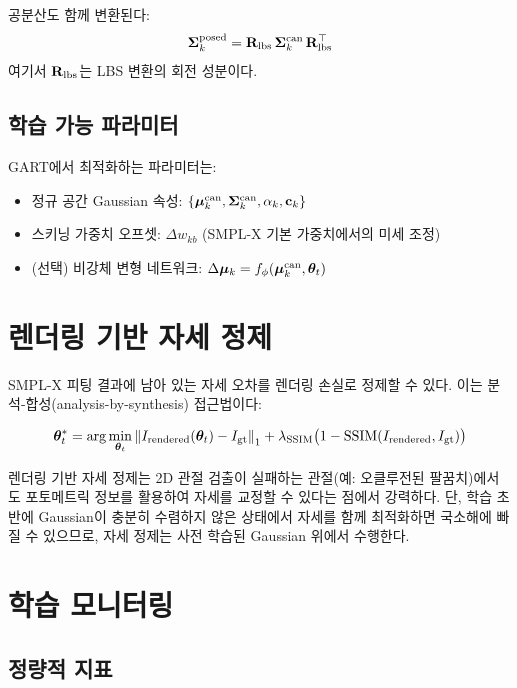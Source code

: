 \documentclass[11pt, a4paper]{report}
\begin{document}
공분산도 함께 변환된다:
\begin{equation}
  \bm{\Sigma}_k^{\text{posed}} = \mathbf{R}_{\text{lbs}} \, \bm{\Sigma}_k^{\text{can}} \, \mathbf{R}_{\text{lbs}}^\top
\end{equation}
여기서 $\mathbf{R}_{\text{lbs}}$는 LBS 변환의 회전 성분이다.

\subsection{학습 가능 파라미터}

GART에서 최적화하는 파라미터는:
\begin{itemize}[nosep]
  \item 정규 공간 Gaussian 속성: $\{\bm{\mu}_k^{\text{can}}, \bm{\Sigma}_k^{\text{can}}, \alpha_k, \mathbf{c}_k\}$
  \item 스키닝 가중치 오프셋: $\Delta w_{kb}$ (SMPL-X 기본 가중치에서의 미세 조정)
  \item (선택) 비강체 변형 네트워크: $\Delta\bm{\mu}_k = f_\phi(\bm{\mu}_k^{\text{can}}, \bm{\theta}_t)$
\end{itemize}

\section{렌더링 기반 자세 정제}

SMPL-X 피팅 결과에 남아 있는 자세 오차를 렌더링 손실로 정제할 수 있다.
이는 분석-합성(analysis-by-synthesis) 접근법이다:

\begin{equation}
  \bm{\theta}_t^* = \arg\min_{\bm{\theta}_t} \left\| I_{\text{rendered}}(\bm{\theta}_t) - I_{\text{gt}} \right\|_1 + \lambda_{\text{SSIM}} \big(1 - \text{SSIM}(I_{\text{rendered}}, I_{\text{gt}})\big)
\end{equation}

\begin{keyidea}
렌더링 기반 자세 정제는 2D 관절 검출이 실패하는 관절(예: 오클루전된 팔꿈치)에서도
포토메트릭 정보를 활용하여 자세를 교정할 수 있다는 점에서 강력하다.
단, 학습 초반에 Gaussian이 충분히 수렴하지 않은 상태에서 자세를 함께 최적화하면
국소해에 빠질 수 있으므로, 자세 정제는 사전 학습된 Gaussian 위에서 수행한다.
\end{keyidea}

\section{학습 모니터링}

\subsection{정량적 지표}
\end{document}
